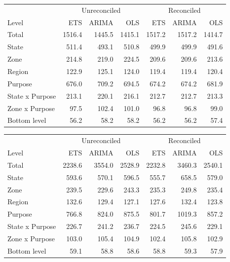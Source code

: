 \documentclass[11pt,a4paper,]{article}
\let\origtable\table
\let\endorigtable\endtable
\renewenvironment{table}[1][2] {
    \expandafter\origtable\expandafter[!htbp]
} {
    \endorigtable
}
\begin{document}
\begin{table}[!h]

\caption{\label{tab:Tourismdataresulrolling}Mean(RMSE) on 2 year test set for ETS, ARIMA and OLS with and without reconciliation - Rolling origin - Tourism dataset}
\centering
\begin{tabular}{lrrrrrr}
\toprule
\multicolumn{1}{c}{} & \multicolumn{3}{c}{Unreconciled} & \multicolumn{3}{c}{Reconciled} \\
\cmidrule(l{2pt}r{2pt}){2-4} \cmidrule(l{2pt}r{2pt}){5-7}
Level & ETS & ARIMA & OLS & ETS & ARIMA & OLS\\
\midrule
Total & 1516.4 & 1445.5 & 1415.1 & 1517.2 & 1517.2 & 1414.7\\
State & 511.4 & 493.1 & 510.8 & 499.9 & 499.9 & 491.6\\
Zone & 214.8 & 219.0 & 224.5 & 209.6 & 209.6 & 213.6\\
Region & 122.9 & 125.1 & 124.0 & 119.4 & 119.4 & 120.4\\
Purpose & 676.0 & 709.2 & 694.5 & 674.2 & 674.2 & 681.9\\
State x Purpose & 213.1 & 220.1 & 216.1 & 212.7 & 212.7 & 213.3\\
Zone x Purpose & 97.5 & 102.4 & 101.0 & 96.8 & 96.8 & 99.0\\
Bottom level & 56.2 & 58.2 & 58.2 & 56.2 & 56.2 & 57.4\\
\bottomrule
\end{tabular}
\end{table}

\begin{table}[t]

\caption{\label{tab:TourismdataresultRMSE}Mean(RMSE) on 2 year test set for ETS, ARIMA and OLS with and without reconciliation - Fixed origin - Tourism dataset}
\centering
\begin{tabular}{lrrrrrr}
\toprule
\multicolumn{1}{c}{} & \multicolumn{3}{c}{Unreconciled} & \multicolumn{3}{c}{Reconciled} \\
\cmidrule(l{2pt}r{2pt}){2-4} \cmidrule(l{2pt}r{2pt}){5-7}
Level & ETS & ARIMA & OLS & ETS & ARIMA & OLS\\
\midrule
Total & 2238.6 & 3554.0 & 2528.9 & 2232.8 & 3460.3 & 2540.1\\
State & 593.6 & 570.1 & 596.5 & 555.7 & 658.5 & 579.0\\
Zone & 239.5 & 229.6 & 243.3 & 235.3 & 249.8 & 235.4\\
Region & 132.6 & 129.4 & 127.1 & 127.6 & 132.4 & 123.8\\
Purpose & 766.8 & 824.0 & 875.5 & 801.7 & 1019.3 & 857.2\\
State x Purpose & 226.7 & 241.2 & 236.7 & 224.5 & 245.6 & 229.1\\
Zone x Purpose & 103.0 & 105.4 & 104.9 & 102.4 & 105.8 & 102.9\\
Bottom level & 59.1 & 58.8 & 58.6 & 58.8 & 59.3 & 57.9\\
\bottomrule
\end{tabular}
\end{table}
\end{document}
